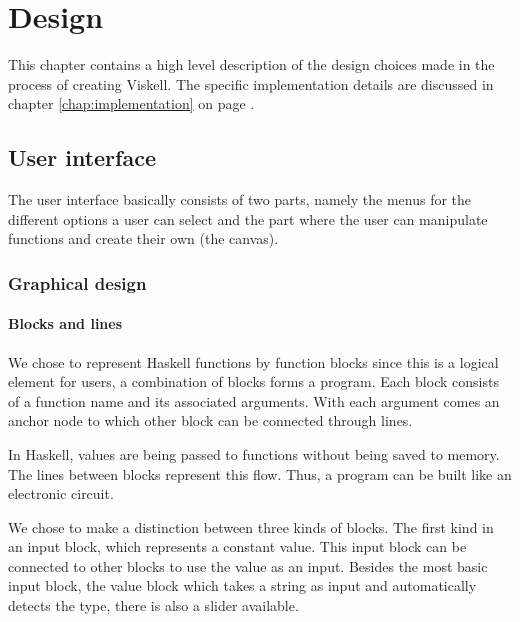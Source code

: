 \chapter{Design}

This chapter contains a high level description of the design choices made in the process of creating Viskell.
The specific implementation details are discussed in chapter \ref{chap:implementation} on page \pageref{chap:implementation}.

\section{User interface}

The user interface basically consists of two parts, namely the menus for the different options a user can select and the part where the user can manipulate functions and create their own (the canvas).

\subsection{Graphical design}

\subsubsection{Blocks and lines}

We chose to represent Haskell functions by function blocks since this is a logical element for users, a combination of blocks forms a program.
Each block consists of a function name and its associated arguments. With each argument comes an anchor node to which other block can be connected through lines.

In Haskell, values are being passed to functions without being saved to memory.
The lines between blocks represent this flow.
Thus, a program can be built like an electronic circuit.

We chose to make a distinction between three kinds of blocks.
The first kind in an input block, which represents a constant value.
This input block can be connected to other blocks to use the value as an input.
Besides the most basic input block, the value block which takes a string as input and automatically detects the type, there is also a slider available.


